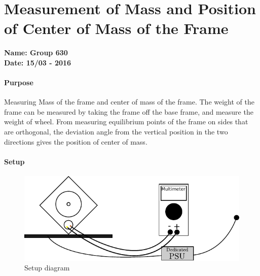 \chapter{Measurement of Mass and Position of Center of Mass of the Frame }\label{app:MassFrameCenterOfMass} 
\textbf{Name: Group 630}\\
\textbf{Date: 15/03 - 2016}

\subsubsection{Purpose}
Measuring Mass of the frame and center of mass of the frame.
The weight of the frame can be measured by taking the frame off the base frame, and measure the weight of wheel. 
From measuring equilibrium points of the frame on sides that are orthogonal, the deviation angle from the vertical position in the two directions gives the position of center of mass.

\subsubsection{Setup}
\begin{figure}[H]
	\centering
	\includegraphics[scale=1]{figures/LabSetupLinearityTest}
	\caption{Setup diagram}
	\label{LabSetupRangeTest2}
\end{figure}\vspace{-5mm}
